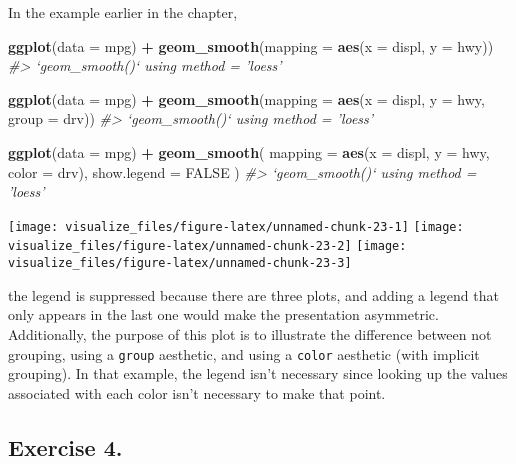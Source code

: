 \documentclass[]{book}
\newenvironment{Shaded}{\begin{snugshade}}{\end{snugshade}}
\newcommand{\CommentTok}[1]{\textcolor[rgb]{0.56,0.35,0.01}{\textit{#1}}}
\newcommand{\DataTypeTok}[1]{\textcolor[rgb]{0.13,0.29,0.53}{#1}}
\newcommand{\KeywordTok}[1]{\textcolor[rgb]{0.13,0.29,0.53}{\textbf{#1}}}
\newcommand{\NormalTok}[1]{#1}
\newcommand{\OperatorTok}[1]{\textcolor[rgb]{0.81,0.36,0.00}{\textbf{#1}}}
\newcommand{\OtherTok}[1]{\textcolor[rgb]{0.56,0.35,0.01}{#1}}
\newcommand{\StringTok}[1]{\textcolor[rgb]{0.31,0.60,0.02}{#1}}
\theoremstyle{definition}
\theoremstyle{definition}
\theoremstyle{definition}
\theoremstyle{remark}
\begin{document}
In the example earlier in the chapter,

\begin{Shaded}
\begin{Highlighting}[]
\KeywordTok{ggplot}\NormalTok{(}\DataTypeTok{data =}\NormalTok{ mpg) }\OperatorTok{+}
\StringTok{  }\KeywordTok{geom_smooth}\NormalTok{(}\DataTypeTok{mapping =} \KeywordTok{aes}\NormalTok{(}\DataTypeTok{x =}\NormalTok{ displ, }\DataTypeTok{y =}\NormalTok{ hwy))}
\CommentTok{#> `geom_smooth()` using method = 'loess'}
              
\KeywordTok{ggplot}\NormalTok{(}\DataTypeTok{data =}\NormalTok{ mpg) }\OperatorTok{+}
\StringTok{  }\KeywordTok{geom_smooth}\NormalTok{(}\DataTypeTok{mapping =} \KeywordTok{aes}\NormalTok{(}\DataTypeTok{x =}\NormalTok{ displ, }\DataTypeTok{y =}\NormalTok{ hwy, }\DataTypeTok{group =}\NormalTok{ drv))}
\CommentTok{#> `geom_smooth()` using method = 'loess'}
    
\KeywordTok{ggplot}\NormalTok{(}\DataTypeTok{data =}\NormalTok{ mpg) }\OperatorTok{+}
\StringTok{  }\KeywordTok{geom_smooth}\NormalTok{(}
    \DataTypeTok{mapping =} \KeywordTok{aes}\NormalTok{(}\DataTypeTok{x =}\NormalTok{ displ, }\DataTypeTok{y =}\NormalTok{ hwy, }\DataTypeTok{color =}\NormalTok{ drv),}
    \DataTypeTok{show.legend =} \OtherTok{FALSE}
\NormalTok{  )}
\CommentTok{#> `geom_smooth()` using method = 'loess'}
\end{Highlighting}
\end{Shaded}

\begin{center}\texttt{[image: visualize\_files/figure-latex/unnamed-chunk-23-1]} \texttt{[image: visualize\_files/figure-latex/unnamed-chunk-23-2]} \texttt{[image: visualize\_files/figure-latex/unnamed-chunk-23-3]} \end{center}

the legend is suppressed because there are three plots, and adding a
legend that only appears in the last one would make the presentation
asymmetric. Additionally, the purpose of this plot is to illustrate the
difference between not grouping, using a \texttt{group} aesthetic, and
using a \texttt{color} aesthetic (with implicit grouping). In that
example, the legend isn't necessary since looking up the values
associated with each color isn't necessary to make that point.

\hypertarget{exercise-4.-2}{%
\subsection{Exercise 4.}\label{exercise-4.-2}}
\end{document}
